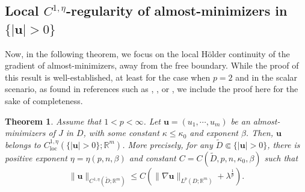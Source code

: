 \documentclass{amsart}
\newtheorem{theorem}{Theorem}[section]
\begin{document}
\subsection{Local $C^{1,\eta}$-regularity of almost-minimizers in $\{|\mathbf{u}|>0\}$}
\label{n-section-3}

Now, in the following theorem, we focus on the local H\"older continuity of the gradient of almost-minimizers, away from the free boundary. While the proof of this result is well-established, at least for the case when $p=2$ and in the scalar scenario, as found in references such as \cite{anzellotti1983}, \cite[Section 3]{MR3385167}, or \cite[Chapter 8]{giusti2003direct}, we include the proof here for the sake of completeness.

\begin{theorem}
\label{T4}
Assume that $1<p<\infty$. Let $\mathbf{u}=(u_1,\cdots,u_m)$ be an almost-minimizers of $J$ in $D$, with some constant $\kappa\le \kappa_0$ and exponent $\beta$. 
Then, $\mathbf{u}$ belongs to $C_{\mathrm{loc}}^{1,\eta} \left(\{|\mathbf{u}| > 0\}; \mathbb{R}^m \right)$.
More precisely, for any $\tilde D\Subset \{|\mathbf{u}| > 0\}$, there is positive exponent $\eta=\eta(p, n, \beta)$ and constant $C=C(\tilde D,p, n, \kappa_0, \beta)$ such that 
\[
\|\mathbf{u}\|_{C^{1,\eta}(\tilde{D}; \mathbb{R}^m)}\leq C \left(
\|\nabla \mathbf{u}\|_{L^{p}(D; \mathbb{R}^m)}
+\lambda^{\frac{1}{p}} \right). 
\]
\end{theorem}
\end{document}
